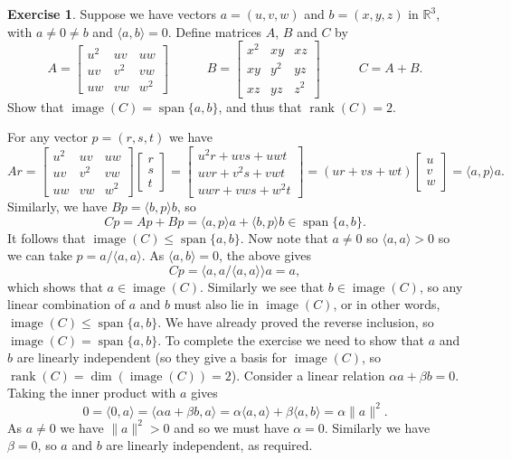 \documentclass{amsart}
\newcommand{\R}         {{\mathbb{R}}}
\newcommand{\bpm}       {\left[\begin{matrix}}
\newcommand{\epm}       {\end{matrix}\right]}
\newcommand{\ip}[1]     {\langle #1\rangle}
\newcommand{\al}        {\alpha}
\newcommand{\bt}        {\beta}
\newcommand{\rank}      {\operatorname{rank}}
\newcommand{\img}       {\operatorname{image}}
\newcommand{\spn}       {\operatorname{span}}
\renewcommand{\:}{\colon}
\theoremstyle{definition}
\newtheorem{exercise}{Exercise}
\newenvironment{solution}{{\noindent \bf Solution:}}{}
\begin{document}
\begin{exercise}
 Suppose we have vectors $a=(u,v,w)$ and $b=(x,y,z)$ in
 $\R^3$, with $a\neq 0\neq b$ and $\ip{a,b}=0$.  Define
 matrices $A$, $B$ and $C$ by
 \[ 
  A = \bpm u^2 & uv & uw \\ uv & v^2 & vw \\ uw & vw & w^2 \epm
  \hspace{3em}
  B = \bpm x^2 & xy & xz \\ xy & y^2 & yz \\ xz & yz & z^2 \epm
  \hspace{3em}
  C = A+B.
 \]
 Show that $\img(C)=\spn\{a,b\}$, and thus that $\rank(C)=2$.
\end{exercise}
\begin{solution}
 For any vector $p=(r,s,t)$ we have
 \[ Ar =
    \bpm u^2 & uv & uw \\ uv & v^2 & vw \\ uw & vw & w^2 \epm
    \bpm r \\ s \\ t \epm =
    \bpm u^2r+uvs+uwt \\ uvr+v^2s+vwt \\ uwr+vws+w^2t \epm = 
    (ur+vs+wt) \bpm u \\ v \\ w \epm = \ip{a,p} a.
 \]
 Similarly, we have $Bp=\ip{b,p}b$, so 
 \[ Cp = Ap + Bp = \ip{a,p}a + \ip{b,p}b \in\spn\{a,b\}. \]
 It follows that $\img(C)\leq\spn\{a,b\}$.  Now note that
 $a\neq 0$ so $\ip{a,a}>0$ so we can take $p=a/\ip{a,a}$.
 As $\ip{a,b}=0$, the above gives 
 \[ Cp = \ip{a,a/\ip{a,a}} a = a, \]
 which shows that $a\in\img(C)$.  Similarly we see that
 $b\in\img(C)$, so any linear combination of $a$ and $b$
 must also lie in $\img(C)$, or in other words,
 $\img(C)\leq\spn\{a,b\}$.  We have already proved the
 reverse inclusion, so $\img(C)=\spn\{a,b\}$.  To complete
 the exercise we need to show that $a$ and $b$ are linearly
 independent (so they give a basis for $\img(C)$, so
 $\rank(C)=\dim(\img(C))=2$).  Consider a linear relation
 $\al a+\bt b=0$.  Taking the inner product with $a$ gives
 \[ 0=\ip{0,a}=\ip{\al a+\bt b,a} = \al\ip{a,a}+\bt\ip{a,b} 
     = \al\|a\|^2.
 \]
 As $a\neq 0$ we have $\|a\|^2>0$ and so we must have
 $\al=0$.  Similarly we have $\bt=0$, so $a$ and $b$ are
 linearly independent, as required.
\end{solution}
\end{document}
